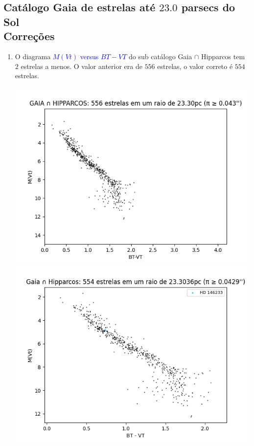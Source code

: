 \documentclass{article}
\begin{document}
	\begin{center}
	\section*{\normalsize  Catálogo Gaia de estrelas até $23.0$ parsecs do Sol\\ \small Correções}
	\end{center}
	\vspace{50pt}
	
	\begin{enumerate}
		
		\item O diagrama \textcolor{blue}{$M(Vt)$ versus $BT-VT$} do sub catálogo Gaia $\cap$ Hipparcos tem $2$ estrelas a menos. O valor anterior era de $556$ estrelas, o valor correto é $554$ estrelas.
		
		\begin{multicols}{2}
			\centering
			\includegraphics[width=.98\linewidth]{gaia_intersection_hipparcos_mvt_versus_bt_minus_vt_plx_greater_than_0.png}
			\columnbreak
			\includegraphics[width=.98\linewidth]{Gaia_intersection_Hipparcos_MVt_versus_BT_minus_VT.png}
		\end{multicols}
	

\end{enumerate}
\end{document}
